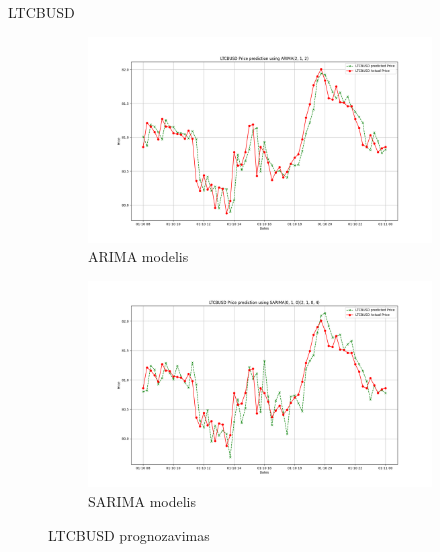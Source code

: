 \documentclass{VUMIFInfKursinis}
\begin{document}
LTCBUSD
\begin{figure}[H]
  \centering
  \begin{subfigure}{.5\textwidth}
    \centering
    \includegraphics[width=\linewidth]{img/LTCBUSD__ARIMA(2, 1, 2).png}
    \caption{ARIMA modelis}
    \label{fig:ltcbusd_arima}
  \end{subfigure}%
  \begin{subfigure}{.5\textwidth}
    \centering
    \includegraphics[width=\linewidth]{img/LTCBUSD_seasonal_ARIMA(0, 1, 0)(2, 1, 0, 4).png}
    \caption{SARIMA modelis}
    \label{fig:ltcbusd_sarima}
  \end{subfigure}
  \caption{LTCBUSD prognozavimas}
  \label{fig:ltcbusd}
\end{figure}
\end{document}
